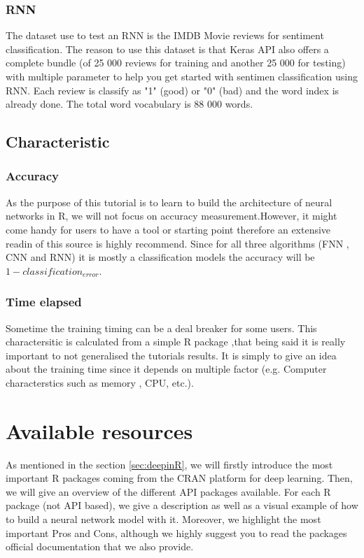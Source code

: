 \documentclass[letter,8pt]{article}\usepackage[]{graphicx}\usepackage[]{color}
\begin{document}
\subsubsection{RNN}
The dataset use to test an RNN is the IMDB Movie reviews for sentiment classification. The reason to use this dataset is that Keras API also offers a complete bundle (of 25 000 reviews for training and another 25 000 for testing) with multiple parameter to help you get started with sentimen classification using RNN. Each review is classify as "1" (good) or "0" (bad) and the word index is already done. The total word vocabulary is 88 000 words.



\subsection{Characteristic}
\subsubsection{Accuracy}
As the purpose of this tutorial is to learn to build the architecture of neural networks in R, we will not focus on accuracy measurement.However, it might come handy for users to have a tool or starting point therefore an extensive readin of this source \cite{perfomancelink} is highly recommend.
Since for all three algorithms (FNN , CNN and RNN) it is mostly a classification models the accuracy will be $1-classification_{error}$.
\subsubsection{Time elapsed}
Sometime the training timing can be a deal breaker for some users. This charactersitic is calculated from a simple R package ,that being said it is really important to not generalised the tutorials results. It is simply to give an idea about the training time since it depends on multiple factor (e.g. Computer characterstics such as memory , CPU, etc.).



\section{Available resources}
\label{sec:avail_ressour}
As mentioned in the section \ref{sec:deepinR}, we will firstly introduce the most important R packages coming from the CRAN platform for deep learning. Then, we will give an overview of the different API packages available. For each R package (not API based), we give a description as well as a visual example of how to build a neural network model with it. Moreover, we highlight the most important Pros and Cons, although we highly suggest you to read the packages official documentation that we also provide.
\end{document}

